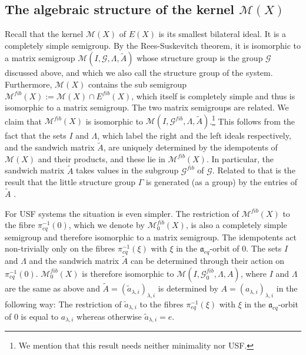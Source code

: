 \documentclass[10pt,a4paper]{amsart}
\numberwithin{equation}{section}
\newcommand{\Gg}{{\mathcal G}}
\newcommand{\aut}{{\mathfrak a}}
\newcommand{\aute}{\aut_{eq}}
\newcommand{\pe}{\pi_{eq}}
\newcommand{\M}{\mathcal M}
\newcommand{\Ef}{E^{fib}}
\begin{document}
\subsection{The algebraic structure of the kernel $\M(X)$}
Recall that the kernel $\M(X)$ of $E(X)$ is its smallest bilateral ideal. It is a completely simple semigroup. By the Rees-Suskevitch theorem, it is isomorphic to a matrix semigroup $\M(I,\Gg,\Lambda,\tilde A)$ whose structure group is the group $\Gg$ discussed above, and which we also call  the structure group of the system. Furthermore,  $\M(X)$ contains the sub semigroup $\M^{fib}(X):=\M(X)\cap \Ef(X)$, which itself is completely simple and thus is isomorphic to a matrix semigroup. The two matrix semigroups are related. We claim that $\M^{fib}(X)$ is isomorphic to 
$\M(I,\Gg^{fib},\Lambda,\tilde A)$.\footnote{We mention that this result needs neither minimality nor USF.}  This follows from the fact that the 
sets $I$ and $\Lambda$, which label the right and the left ideals respectively, and the sandwich matrix $\tilde A$, are uniquely determined by the idempotents of $\M(X)$ and their products, and these lie in $\M^{fib}(X)$. In particular, the sandwich matrix $\tilde A$ takes values in the subgroup $\Gg^{fib}$ of $\Gg$. Related to that is the result that the little structure group $\Gamma$ is generated (as a group) by the entries of $\tilde A$ \cite{ESBS}.

For USF systems %
the situation is even simpler. The restriction of $\M^{fib}(X)$ to the fibre $\pe^{-1}(0)$, which we denote by $\M_0^{fib}(X)$, is also a completely simple semigroup and therefore isomorphic to a matrix semigroup. The idempotents act non-trivially only on the fibres $\pe^{-1}(\xi)$ with $\xi$ in the $\aute$-orbit of $0$. The sets $I$ and $\Lambda$ and the sandwich matrix $\tilde A$ can be determined through their action on $\pe^{-1}(0)$. $\M_0^{fib}(X)$ is therefore isomorphic to 
$\M(I,\Gg^{fib}_0,\Lambda,A)$, where $I$ and $\Lambda$ are the same as above and $\tilde A=(\tilde a_{\lambda,i})_{\lambda,i}$ is determined by $A=(a_{\lambda,i})_{\lambda,i}$ in the following way:
The restriction of  $\tilde a_{\lambda,i}$ to the fibres $\pe^{-1}(\xi)$ with $\xi$ in the $\aute$-orbit of $0$ is equal to $a_{\lambda,i}$ whereas otherwise 
$\tilde a_{\lambda,i}=e$.
\end{document}
